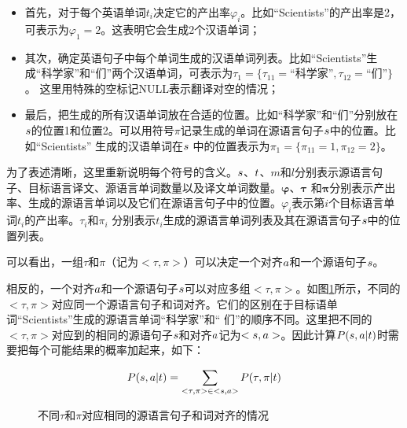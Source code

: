 \begin{itemize}
\vspace{0.3em}
\item 首先，对于每个英语单词$t_i$决定它的产出率$\varphi_{i}$。比如“Scientists”的产出率是2，可表示为${\varphi}_{1}=2$。这表明它会生成2个汉语单词；
\vspace{0.3em}
\item 其次，确定英语句子中每个单词生成的汉语单词列表。比如“Scientists”生成“科学家”和“们”两个汉语单词，可表示为${\tau}_1=\{{\tau}_{11}=\textrm{“科学家”},{\tau}_{12}=\textrm{“们”}\}$。 这里用特殊的空标记NULL表示翻译对空的情况；
\vspace{0.3em}
\item 最后，把生成的所有汉语单词放在合适的位置。比如“科学家”和“们”分别放在${s}$的位置1和位置2。可以用符号$\pi$记录生成的单词在源语言句子${s}$中的位置。比如“Scientists” 生成的汉语单词在${s}$ 中的位置表示为${\pi}_{1}=\{{\pi}_{11}=1,{\pi}_{12}=2\}$。
\vspace{0.3em}
\end{itemize}

\parinterval 为了表述清晰，这里重新说明每个符号的含义。${s}$、${t}$、$m$和$l$分别表示源语言句子、目标语言译文、源语言单词数量以及译文单词数量。$\mathbf{\varphi}$、$\mathbf{\tau}$ 和$\mathbf{\pi}$分别表示产出率、生成的源语言单词以及它们在源语言句子中的位置。${\varphi}_{i}$表示第$i$个目标语言单词$t_i$的产出率。${\tau}_{i}$和${\pi}_i$ 分别表示$t_i$生成的源语言单词列表及其在源语言句子${s}$中的位置列表。

\parinterval 可以看出，一组$\tau$和$\pi$（记为$<\tau,\pi>$）可以决定一个对齐${a}$和一个源语句子${s}$。

\noindent 相反的，一个对齐${a}$和一个源语句子${s}$可以对应多组$<\tau,\pi>$。如图\ref{fig:6-6}所示，不同的$<\tau,\pi>$对应同一个源语言句子和词对齐。它们的区别在于目标语单词“Scientists”生成的源语言单词“科学家”和“ 们”的顺序不同。这里把不同的$<\tau,\pi>$对应到的相同的源语句子${s}$和对齐${a}$记为$<{s},{a}>$。因此计算${P}({s},{a}| {t})$时需要把每个可能结果的概率加起来，如下：

\begin{equation}
{P}({s},{a}| {t})=\sum_{{<\tau,\pi>}\in{<{s},{a}>}}{{P}(\tau,\pi|{t}) }
\label{eq:6-9}
\end{equation}
\begin{figure}[htp]
    \centering

   \caption{不同$\tau$和$\pi$对应相同的源语言句子和词对齐的情况}
   \label{fig:6-6}
\end{figure}

